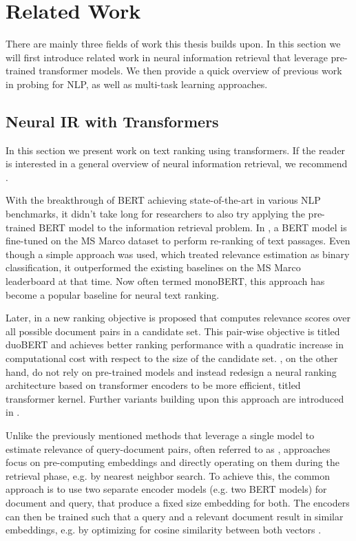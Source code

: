 \chapter{Related Work}
\label{chap:prev}
There are mainly three fields of work this thesis builds upon. In this section we will first introduce related work in neural information retrieval that leverage pre-trained transformer models. We then provide a quick overview of previous work in probing for NLP, as well as multi-task learning approaches.

\section{Neural IR with Transformers}
In this section we present work on text ranking using transformers. If the reader is interested in a general overview of neural information retrieval, we recommend \citep{Onal2017NeuralIR, mitra2018an, Guo2020ADL}.

With the breakthrough of BERT \citep{devlin-etal-2019-bert} achieving state-of-the-art in various NLP benchmarks, it didn't take long for researchers to also try applying the pre-trained BERT model to the information retrieval problem. In \citep{Nogueira2019PassageRW}, a BERT model is fine-tuned on the MS Marco dataset \citep{DBLP:journals/corr/NguyenRSGTMD16} to perform re-ranking of text passages. Even though a simple approach was used, which treated relevance estimation as binary classification, it outperformed the existing baselines on the MS Marco leaderboard at that time. Now often termed monoBERT, this approach has become a popular baseline for neural text ranking.

Later, in \citep{Nogueira2019MultiStageDR} a new ranking objective is proposed that computes relevance scores over all possible document pairs in a candidate set. This pair-wise objective is titled duoBERT and achieves better ranking performance with a quadratic increase in computational cost with respect to the size of the candidate set. \citet{DBLP:journals/corr/abs-1912-01385}, on the other hand, do not rely on pre-trained models and instead redesign a neural ranking architecture based on transformer encoders to be more efficient, titled transformer kernel. Further variants building upon this approach are introduced in \citep{Hofsttter2020LocalSO, 10.1145/3404835.3463049}.

Unlike the previously mentioned methods that leverage a single model to estimate relevance of query-document pairs, often referred to as ,  approaches focus on pre-computing embeddings and directly operating on them during the retrieval phase, e.g. by nearest neighbor search. To achieve this, the common approach is to use two separate encoder models (e.g. two BERT models) for document and query, that produce a fixed size embedding for both. The encoders can then be trained such that a query and a relevant document result in similar embeddings, e.g. by optimizing for cosine similarity between both vectors \citep{Humeau2020Poly-encoders, 10.1145/3397271.3401075, DBLP:journals/corr/abs-1908-10084}.


